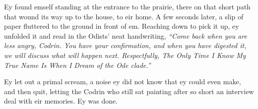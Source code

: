 Ey found emself standing at the entrance to the prairie, there on that short path that wound its way up to the house, to eir home. A few seconds later, a slip of paper fluttered to the ground in front of em. Reaching down to pick it up, ey unfolded it and read in the Odists' neat handwriting, \emph{``Come back when you are less angry, Codrin. You have your confirmation, and when you have digested it, we will discuss what will happen next. Respectfully, The Only Time I Know My True Name Is When I Dream of the Ode clade.''}

Ey let out a primal scream, a noise ey did not know that ey could even make, and then quit, letting the Codrin who still sat painting after so short an interview deal with eir memories. Ey was done.
